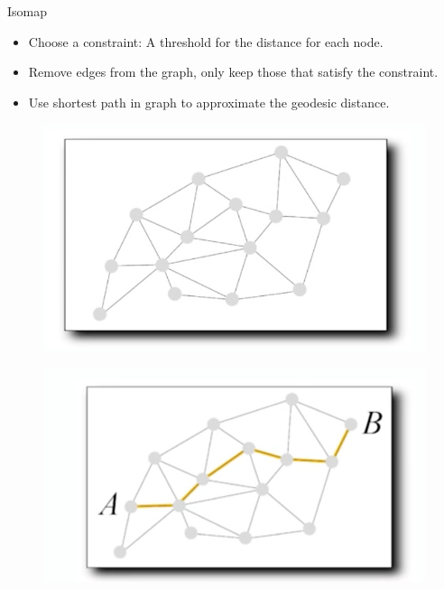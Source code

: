 \documentclass[xcolor={dvipsnames,table}]{beamer}
\begin{document}
\begin{frame}{Isomap}
	\begin{itemize}
		\item Choose a constraint: A threshold for the distance for each node.
	 	\item Remove edges from the graph, only keep those that satisfy the constraint.
	 	\item Use shortest path in graph to approximate the geodesic distance.
	 \end{itemize}
	\begin{figure}
    \begin{minipage}{0.499\linewidth}{
            \centering
                \includegraphics[width=\linewidth]{isoexplain2.png}%
        }
    \end{minipage}%
    \begin{minipage}{0.499\linewidth}{
            \centering
            \includegraphics[width=\linewidth]{isoexplain3.png}
        }
    \end{minipage}
\end{figure}
	
\end{frame} 
\end{document}
